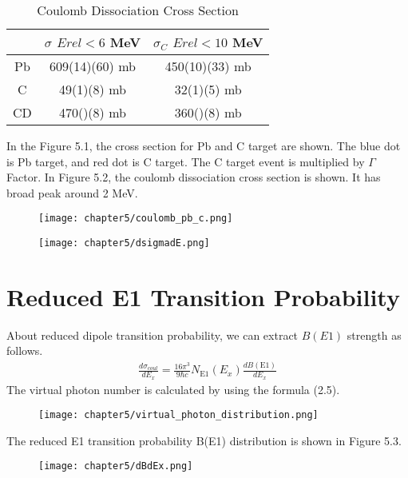 \begin{table}[h]
    \centering
    \begin{tabular}[h]{c|c|c}
        \hline
         & $\sigma$  $E{rel} < 6$ MeV& $\sigma_{C}$ $E{rel} < 10$ MeV \\
        \hline
        Pb &  609(14)(60) mb & 450(10)(33) mb  \\
        C &  49(1)(8) mb & 32(1)(5) mb  \\
        CD &  470()(8) mb & 360()(8) mb \\
        \hline
    \end{tabular}
\caption{Coulomb Dissociation Cross Section}
\label{Coulomb Dissociation Cross Section}
\end{table}
In the Figure 5.1, the cross section for Pb and C target are shown. The blue dot is Pb target, and red dot is C target. The C target event is multiplied by $\Gamma$ Factor. In Figure 5.2, the coulomb dissociation cross section is shown. It has broad peak around 2 MeV.
\begin{figure}[h]
    \centering
    \texttt{[image: chapter5/coulomb\_pb\_c.png]}    
\end{figure}
\begin{figure}[h]
    \centering
    \texttt{[image: chapter5/dsigmadE.png]}    
\end{figure}    
\clearpage

\section{Reduced E1 Transition Probability}
About reduced dipole transition probability, we can extract $B(E1)$ strength as follows.
\begin{align}
    \frac{d \sigma_{coul}}{dE_x} = \frac{16 \pi^{3} }{9 \hbar c} N_{\text{E1}}(E_x) \frac{dB(\text{E1})}{dE_x}
\end{align}
The virtual photon number is calculated by using the formula (2.5).

\begin{figure}[h]
    \centering
    \texttt{[image: chapter5/virtual\_photon\_distribution.png]}
\end{figure}
The reduced E1 transition probability B(E1) distribution is shown in Figure 5.3.
\begin{figure}[h]
    \centering
    \texttt{[image: chapter5/dBdEx.png]}    
\end{figure}  

